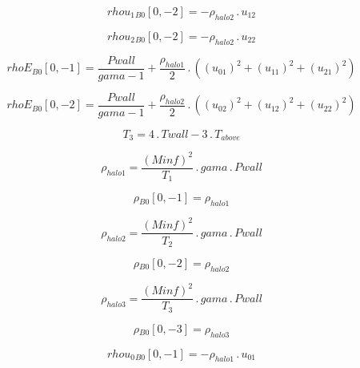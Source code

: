 \documentclass{article}
\begin{document}
\begin{dmath}{rhou_{1}{_{B0}}}[{0,-2}] = - \rho_{halo 2} \,.\, u_{12}\end{dmath}

\begin{dmath}{rhou_{2}{_{B0}}}[{0,-2}] = - \rho_{halo 2} \,.\, u_{22}\end{dmath}

\begin{dmath}{rhoE{_{B0}}}[{0,-1}] = \frac{Pwall}{gama - 1} + \frac{\rho_{halo 1}}{2} \,.\, \left(\left(u_{01} \right)^{2} + \left(u_{11} \right)^{2} + \left(u_{21} \right)^{2}\right)\end{dmath}

\begin{dmath}{rhoE{_{B0}}}[{0,-2}] = \frac{Pwall}{gama - 1} + \frac{\rho_{halo 2}}{2} \,.\, \left(\left(u_{02} \right)^{2} + \left(u_{12} \right)^{2} + \left(u_{22} \right)^{2}\right)\end{dmath}

\begin{dmath}T_{3} = 4 \,.\, Twall - 3 \,.\, T_{above}\end{dmath}

\begin{dmath}\rho_{halo 1} = \frac{\left(Minf \right)^{2}}{T_{1}} \,.\, gama \,.\, Pwall\end{dmath}

\begin{dmath}{\rho{_{B0}}}[{0,-1}] = \rho_{halo 1}\end{dmath}

\begin{dmath}\rho_{halo 2} = \frac{\left(Minf \right)^{2}}{T_{2}} \,.\, gama \,.\, Pwall\end{dmath}

\begin{dmath}{\rho{_{B0}}}[{0,-2}] = \rho_{halo 2}\end{dmath}

\begin{dmath}\rho_{halo 3} = \frac{\left(Minf \right)^{2}}{T_{3}} \,.\, gama \,.\, Pwall\end{dmath}

\begin{dmath}{\rho{_{B0}}}[{0,-3}] = \rho_{halo 3}\end{dmath}

\begin{dmath}{rhou_{0}{_{B0}}}[{0,-1}] = - \rho_{halo 1} \,.\, u_{01}\end{dmath}
\end{document}
